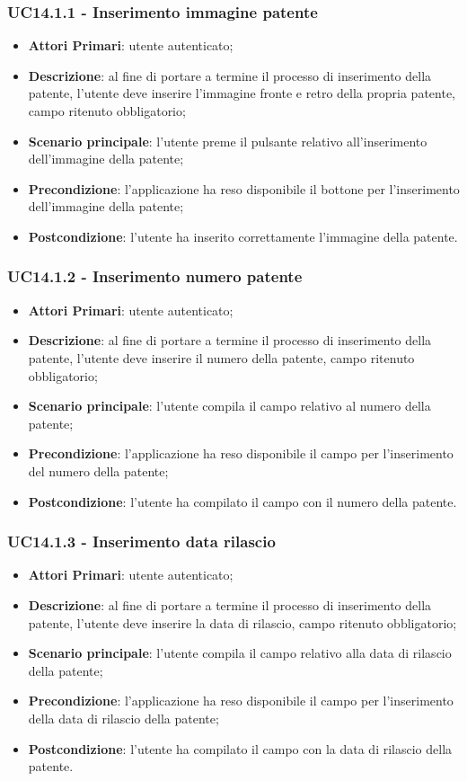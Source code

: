 \subsubsection{UC14.1.1 - Inserimento immagine patente}
\begin{itemize}
	\item \textbf{Attori Primari}: utente autenticato;
	\item \textbf{Descrizione}: al fine di portare a termine il processo di inserimento della patente, l'utente deve inserire l'immagine fronte e retro della propria patente, campo ritenuto obbligatorio; 
	\item \textbf{Scenario principale}: l'utente preme il pulsante relativo all'inserimento dell'immagine della patente;	
	\item \textbf{Precondizione}: l'applicazione ha reso disponibile il bottone per l'inserimento dell'immagine della patente;
	\item \textbf{Postcondizione}: l'utente ha inserito correttamente l'immagine della patente.
\end{itemize}
\subsubsection{UC14.1.2 - Inserimento numero patente}
\begin{itemize}
	\item \textbf{Attori Primari}: utente autenticato;
	\item \textbf{Descrizione}: al fine di portare a termine il processo di inserimento della patente, l'utente deve inserire il numero della patente, campo ritenuto obbligatorio; 
	\item \textbf{Scenario principale}: l'utente compila il campo relativo al numero della patente;	
	\item \textbf{Precondizione}: l'applicazione ha reso disponibile il campo per l'inserimento del numero della patente;
	\item \textbf{Postcondizione}: l'utente ha compilato il campo con il numero della patente.
\end{itemize}
\subsubsection{UC14.1.3 - Inserimento data rilascio}
\begin{itemize}
	\item \textbf{Attori Primari}: utente autenticato;
	\item \textbf{Descrizione}: al fine di portare a termine il processo di inserimento della patente, l'utente deve inserire la data di rilascio, campo ritenuto obbligatorio; 
	\item \textbf{Scenario principale}: l'utente compila il campo relativo alla data di rilascio della patente;	
	\item \textbf{Precondizione}: l'applicazione ha reso disponibile il campo per l'inserimento della data di rilascio della patente;
	\item \textbf{Postcondizione}: l'utente ha compilato il campo con la data di rilascio della patente.
\end{itemize}

